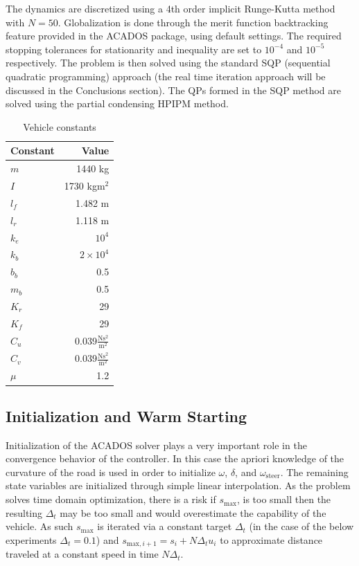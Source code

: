 \documentclass[conference,11pt]{IEEEtran}
\begin{document}
The dynamics are discretized using a 4th order implicit Runge-Kutta method with $N = 50$. Globalization is done through the merit function backtracking feature provided in the ACADOS package, using
default settings. The required stopping tolerances for stationarity and inequality are set to $10^{-4}$ and $10^{-5}$ respectively. The problem is then solved using the standard SQP (sequential
quadratic programming) approach (the real time iteration approach will be discussed in the Conclusions section). The QPs formed in the SQP method are solved using the partial condensing HPIPM
\cite{FRISON2003} method.
\begin{table}[t]
  \centering
  \begin{tabular}{l|r}
    Constant & Value \\\hline
    $m$& 1440 kg\\
    $I$&1730 kgm$^2$\\
    $l_f$&1.482 m\\
    $l_r$&1.118 m\\
    $k_e$&$10^4$\\
    $k_b$&$2\times 10^4$\\
    $b_b$&0.5\\
    $m_b$&0.5\\
    $K_r$&29\\
    $K_f$&29\\
    $C_u$&0.039$\frac{\mathrm{N}\mathrm{s}^2}{\mathrm{m}^2}$\\
    $C_v$&0.039$\frac{\mathrm{N}\mathrm{s}^2}{\mathrm{m}^2}$\\
    $\mu$&1.2\\
  \end{tabular}
  \caption{Vehicle constants}
  \label{tab:veh}
\end{table}
\subsection{Initialization and Warm Starting}
Initialization of the ACADOS solver plays a very important role in the convergence behavior of the controller. In this case the apriori knowledge of the curvature of the road is used in order to
initialize $\omega$, $\delta$, and $\omega_{\mathrm{steer}}$. The remaining state variables are initialized through simple linear interpolation. As the problem solves time domain optimization, there
is a risk if $s_{\mathrm{max}}$, is too small then the resulting $\Delta_t$ may be too small and would overestimate the capability of the vehicle. As such $s_{\mathrm{max}}$ is iterated via a
constant target $\Delta_t$ (in the case of the below experiments $\Delta_t = 0.1$) and $s_{\mathrm{max},i+1}= s_i + N\Delta_tu_i$ to approximate distance traveled at a constant speed in time
$N\Delta_t$. 
\end{document}
